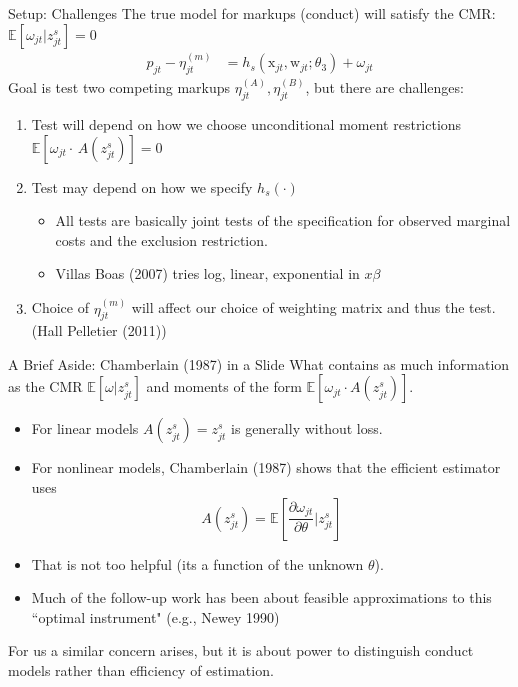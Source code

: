 \documentclass[aspectratio=169,10pt]{beamer}
\begin{document}
\begin{frame}{Setup: Challenges}
The true model for markups (conduct) will satisfy the CMR: $\mathbb{E}[\omega_{jt} | z_{jt}^s]=0$
\begin{align*}p_{jt} - \eta_{jt}^{(m)} &= h_s(\textrm{x}_{jt}, \textrm{w}_{jt}; \theta_3) + \omega_{jt}
\end{align*}
Goal is test two competing markups $\eta_{jt}^{(A)},\eta_{jt}^{(B)}$, but there are challenges:
\pause
\begin{enumerate}
\item Test will depend on how we choose \alert{unconditional moment restrictions} $\mathbb{E}[\omega_{jt} \cdot \, A(z_{jt}^s)]=0$
\pause
\item Test may depend on how we specify $h_s(\cdot)$
\begin{itemize}
\item All tests are basically joint tests of the specification for \alert{observed marginal costs} and the  \alert{exclusion restriction}.
\item Villas Boas (2007) tries log, linear, exponential in $x \beta $
\end{itemize}
\pause
\item Choice of $\eta_{jt}^{(m)}$ will affect our choice of \alert{weighting matrix} and thus the test. (Hall Pelletier (2011))
\end{enumerate}
\end{frame}


\begin{frame}[plain,label=chamberlain]{A Brief Aside: Chamberlain (1987) in a Slide}
What contains as much information as the CMR $\mathbb{E}[\omega|z_{jt}^s]$ and moments of the form $ \mathbb{E}[\omega_{jt}\cdot A(z_{jt}^s)]. $
\begin{itemize}
\item For linear models $A(z_{jt}^s) = z_{jt}^s$ is generally without loss.
\item For nonlinear models, Chamberlain (1987) shows that the efficient estimator uses
$$A(z_{jt}^s) = \mathbb{E}\left[\frac{\partial \omega_{jt}}{\partial \theta}|z_{jt}^s\right]$$
\item That is not too helpful (its a function of the unknown $\theta$).
\item Much of the follow-up work has been about feasible approximations to this ``optimal instrument" (e.g., Newey 1990)
\end{itemize}
For us a similar concern arises, but it is about \alert{power} to distinguish conduct models rather than \alert{efficiency} of estimation.
\end{frame}
\end{document}
